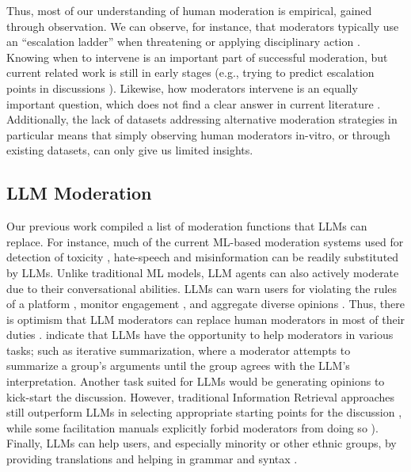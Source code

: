 Thus, most of our understanding of human moderation is empirical, gained through observation. We can observe, for instance, that moderators typically use an “escalation ladder” when threatening or applying disciplinary action \cite{seering_self_moderation}. Knowing when to intervene is an important part of successful moderation, but current related work 
is still in early stages (e.g., trying to predict escalation points in discussions \cite{korre2025evaluation}). Likewise, how moderators intervene is an equally important question, which does not find a clear answer in current literature \cite{korre2025evaluation}. Additionally, the lack of datasets addressing alternative moderation strategies in particular \cite{korre2025evaluation} means that simply observing human moderators in-vitro, or through existing datasets, can only give us limited insights.


\subsection{LLM Moderation}

Our previous work \cite{korre2025evaluation} compiled a list of moderation functions that \acp{LLM} can replace. For instance, much of the current \ac{ML}-based moderation systems used for detection of toxicity \cite{kang-qian-2024-implanting, Wang2022ToxicityDW}, hate-speech \cite{Nirmal2024TowardsIH, shi-2024-hatespeech} and misinformation \cite{Liu2024DetectIJ, Xu2024ACS} can be readily substituted by \acp{LLM}. Unlike traditional \ac{ML} models, \ac{LLM} agents can also actively moderate due to their conversational abilities. \acp{LLM} can warn users for violating the rules of a platform \cite{Kumar_AbuHashem_Durumeric_2024}, monitor engagement \cite{schroeder-etal-2024-fora}, and aggregate diverse opinions \cite{small-polis-llm}. Thus, there is optimism that \ac{LLM} moderators can replace human moderators in most of their duties \cite{small-polis-llm, seering_self_moderation}. \textcite{small-polis-llm} indicate that \acp{LLM} have the opportunity to help moderators in various tasks; such as iterative summarization, where a moderator attempts to summarize a group's arguments until the group agrees with the \ac{LLM}'s interpretation. Another task suited for \acp{LLM} would be generating opinions to kick-start the discussion. However, traditional Information Retrieval approaches still outperform \acp{LLM} in selecting appropriate starting points for the discussion \cite{karadzhov2023delidata}, while some facilitation manuals explicitly forbid moderators from doing so \cite{dimitra-guide}). Finally, \acp{LLM} can help users, and especially minority or other ethnic groups, by providing translations and helping in grammar and syntax \cite{Tsai2024Generative}.

